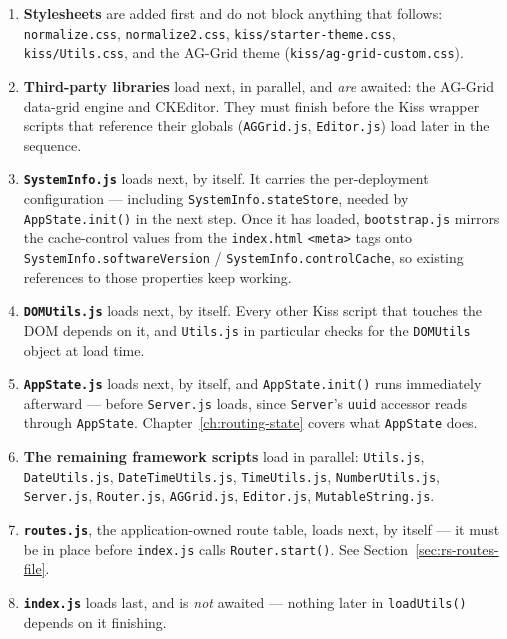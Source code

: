 \begin{enumerate}
  \item \textbf{Stylesheets} are added first and do not block anything that follows: \texttt{normalize.css}, \texttt{normalize2.css}, \texttt{kiss/starter-theme.css}, \texttt{kiss/Utils.css}, and the AG-Grid theme (\texttt{kiss/ag-grid-custom.css}).
  \item \textbf{Third-party libraries} load next, in parallel, and \emph{are} awaited: the AG-Grid data-grid engine and CKEditor.  They must finish before the Kiss wrapper scripts that reference their globals (\texttt{AGGrid.js}, \texttt{Editor.js}) load later in the sequence.
  \item \textbf{\texttt{SystemInfo.js}} loads next, by itself.  It carries the per-deployment configuration --- including \texttt{SystemInfo.stateStore}, needed by \texttt{AppState.init()} in the next step.  Once it has loaded, \texttt{bootstrap.js} mirrors the cache-control values from the \texttt{index.html} \texttt{<meta>} tags onto \texttt{SystemInfo.softwareVersion} / \texttt{SystemInfo.controlCache}, so existing references to those properties keep working.
  \item \textbf{\texttt{DOMUtils.js}} loads next, by itself.  Every other Kiss script that touches the DOM depends on it, and \texttt{Utils.js} in particular checks for the \texttt{DOMUtils} object at load time.
  \item \textbf{\texttt{AppState.js}} loads next, by itself, and \texttt{AppState.init()} runs immediately afterward --- before \texttt{Server.js} loads, since \texttt{Server}'s \texttt{uuid} accessor reads through \texttt{AppState}.  Chapter~\ref{ch:routing-state} covers what \texttt{AppState} does.
  \item \textbf{The remaining framework scripts} load in parallel: \texttt{Utils.js}, \texttt{DateUtils.js}, \texttt{DateTimeUtils.js}, \texttt{TimeUtils.js}, \texttt{NumberUtils.js}, \texttt{Server.js}, \texttt{Router.js}, \texttt{AGGrid.js}, \texttt{Editor.js}, \texttt{MutableString.js}.
  \item \textbf{\texttt{routes.js}}, the application-owned route table, loads next, by itself --- it must be in place before \texttt{index.js} calls \texttt{Router.start()}.  See Section~\ref{sec:rs-routes-file}.
  \item \textbf{\texttt{index.js}} loads last, and is \emph{not} awaited --- nothing later in \texttt{loadUtils()} depends on it finishing.
\end{enumerate}

